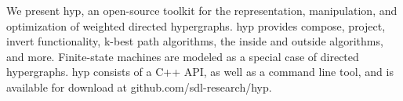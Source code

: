 We present hyp, an open-source toolkit for the representation, manipulation, and optimization of weighted directed hypergraphs. hyp provides compose, project, invert functionality, k-best path algorithms, the inside and outside algorithms, and more. Finite-state machines are modeled as a special case of directed hypergraphs. hyp consists of a C++ API, as well as a command line tool, and is available for download at github.com/sdl-research/hyp.
